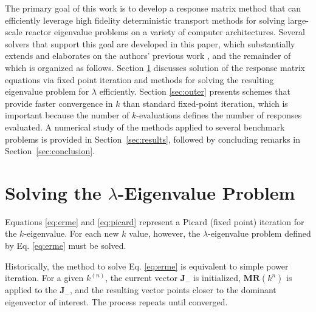 The primary goal of this work is to develop a response matrix method that
can efficiently leverage high fidelity deterministic transport methods for 
solving large-scale reactor eigenvalue problems on a variety of computer 
architectures.  
Several solvers that support this goal are developed in this paper,
which substantially extends and elaborates on the authors' 
previous work \cite{roberts2011ser, roberts2012ksi}, and
the remainder of which is organized as follows.
 Section \ref{sec:inner}
discusses solution of the response matrix equations via fixed point 
iteration and methods for solving the resulting eigenvalue problem 
for $\lambda$ efficiently.  Section \ref{sec:outer} presents schemes 
that provide faster convergence in $k$ than standard fixed-point iteration,
which is important because the number of $k$-evaluations defines the 
number of responses evaluated.  A numerical study 
of the methods applied to several benchmark problems is 
provided in Section~\ref{sec:results}, followed by concluding remarks in
Section~\ref{sec:conclusion}.


\section{Solving the $\lambda$-Eigenvalue Problem}
\label{sec:inner}


Equations \ref{eq:erme} and \ref{eq:picard} represent
a Picard (fixed point) iteration
for the $k$-eigenvalue.  For each new $k$ value, however, the 
$\lambda$-eigenvalue problem defined by Eq. \ref{eq:erme} must be 
solved.

Historically, the method to solve Eq. \ref{eq:erme} is equivalent to 
simple power iteration.
For a given $k^{(n)}$, the current vector $\mathbf{J}_{-}$ is 
initialized,
$\mathbf{MR}(k^{n})$ is applied to the $\mathbf{J}_{-}$, and the resulting 
vector points closer to the dominant eigenvector of interest.  
The process repeats until converged. 

